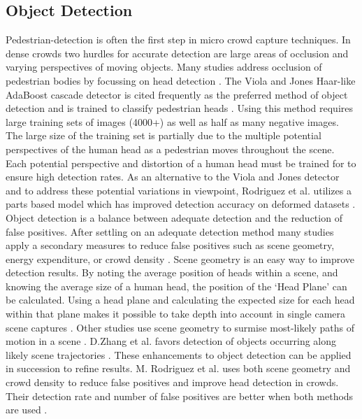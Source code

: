 \documentclass[12pt, twocolumn, conference]{IEEEtran}
\begin{document}
\subsection{Object Detection}

Pedestrian-detection is often the first step in micro crowd capture techniques. In dense crowds two hurdles for accurate detection are large areas of occlusion and varying perspectives of moving objects. Many studies address occlusion of pedestrian bodies by focussing on head detection \cite{M. Rodriguez}\cite{D. Zhang}\cite{I. Ali}\cite{I. Ali2}. The Viola and Jones Haar-like AdaBoost cascade detector is cited frequently as the preferred method of object detection and is trained to classify pedestrian heads \cite{D. Zhang}\cite{I. Ali}\cite{I. Ali2}. Using this method requires large training sets of images (4000+) as well as half as many negative images. The large size of the training set is partially due to the multiple potential perspectives of the human head as a pedestrian moves throughout the scene. Each potential perspective and distortion of a human head must be trained for to ensure high detection rates. As an alternative to the Viola and Jones detector and to address these potential variations in viewpoint, Rodriguez et al. utilizes a parts based model which has improved detection accuracy on deformed datasets \cite{D. Forsyth}.
Object detection is a balance between adequate detection and the reduction of false positives. After settling on an adequate detection method many studies apply a secondary measures to reduce false positives such as scene geometry, energy expenditure, or crowd density \cite{M. Rodriguez}\cite{D. Zhang}\cite{I. Ali}\cite{I. Ali2}. Scene geometry is an easy way to improve detection results. By noting the average position of heads within a scene, and knowing the average size of a human head, the position of the ‘Head Plane’ can be calculated. Using a head plane and calculating the expected size for each head within that plane makes it possible to take depth into account in single camera scene captures \cite{M. Rodriguez}\cite{I. Ali2}.  Other studies use scene geometry to surmise most-likely paths of motion in a scene \cite{M. Rodriguez}\cite{D. Zhang}.  D.Zhang et al. favors detection of objects occurring along likely scene trajectories \cite{D. Zhang}. 
These enhancements to object detection can be applied in succession to refine results. M. Rodriguez et al. uses both scene geometry and crowd density to reduce false positives and improve head detection in crowds. Their detection rate and number of false positives are better when both methods are used \cite{M. Rodriguez}. 
\end{document}
